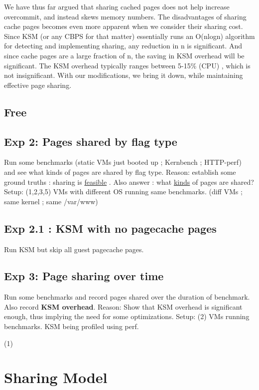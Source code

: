 \documentclass[10pt,a4paper]{article}
\begin{document}
We have thus far argued that sharing cached pages does not help
increase overcommit, and instead skews memory numbers. 
The disadvantages of sharing cache pages becomes even more apparent
when we consider their sharing cost. 
Since KSM (or any CBPS for that matter) essentially runs an O(nlogn)
algorithm for detecting and implementing sharing, any reduction in n
is significant. And since cache pages are a large fraction of n, the
saving in KSM overhead will be significant. 
The KSM overhead typically ranges between 5-15\% (CPU) , which is not
insignificant.
With our modifications, we bring it down, while maintaining effective
page sharing. 


\subsection{Free}


\subsection{Exp 2: Pages shared by flag type}

Run some benchmarks (static VMs just booted up ; Kernbench ; HTTP-perf) and see what kinds of pages are shared by flag type.
Reason: establish some ground truths : sharing is \underline{feasible} . Also answer : what \underline{kinds} of pages are shared?
Setup: (1,2,3,5) VMs with different OS running same benchmarks. (diff VMs ; same kernel ; same /var/www) 

\subsection{Exp 2.1 : KSM with no pagecache pages}

Run KSM but skip all guest pagecache pages.

\subsection{Exp 3: Page sharing over time}

Run some benchmarks and record pages shared over the duration of benchmark. Also record \textbf{KSM overhead}.
Reason: Show that KSM overhead is significant enough, thus implying the need for some optimizations.
Setup: (2) VMs running benchmarks. KSM being profiled using perf.

(1)

\section{Sharing Model}
\end{document}
